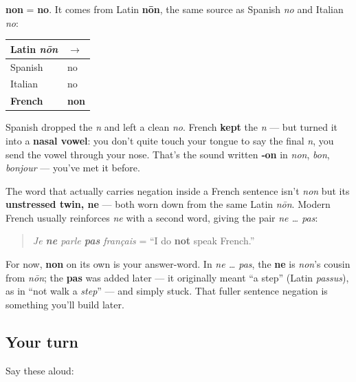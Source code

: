 \begin{cousinweb}
\textbf{non} = \textbf{no}. It comes from Latin \textbf{nōn}, the same source as Spanish \emph{no} and Italian \emph{no}:

\noindent
\begin{tabularx}{\linewidth}{@{}>{\raggedright\arraybackslash}X>{\raggedright\arraybackslash}X@{}}
\toprule
\textbf{Latin \emph{nōn}} & \textbf{$\to$} \\
\midrule
Spanish & no \\
Italian & no \\
\textbf{French} & \textbf{non} \\
\bottomrule
\end{tabularx}

Spanish dropped the \emph{n} and left a clean \emph{no}. French \textbf{kept} the \emph{n} — but turned it into a \textbf{nasal vowel}: you don't quite touch your tongue to say the final \emph{n}, you send the vowel through your nose. That's the sound written \textbf{‑on} in \emph{non}, \emph{bon}, \emph{bonjour} — you've met it before.
\end{cousinweb}

\begin{grammarlens}[title={Grammar Lens: The seed of French negation}]
The word that actually carries negation inside a French sentence isn't \emph{non} but its \textbf{unstressed twin, ne} — both worn down from the same Latin \emph{nōn}. Modern French usually reinforces \emph{ne} with a second word, giving the pair \emph{ne … pas}:

\begin{quote}
\emph{Je \textbf{ne} parle \textbf{pas} français} = \textquotedblleft{}I do \textbf{not} speak French.\textquotedblright{}
\end{quote}

For now, \textbf{non} on its own is your answer-word. In \emph{ne … pas}, the \textbf{ne} is \emph{non}'s cousin from \emph{nōn}; the \textbf{pas} was added later — it originally meant \textquotedblleft{}a step\textquotedblright{} (Latin \emph{passus}), as in \textquotedblleft{}not walk a \emph{step}\textquotedblright{} — and simply stuck. That fuller sentence negation is something you'll build later.
\end{grammarlens}

\subsection*{Your turn}
Say these aloud:

